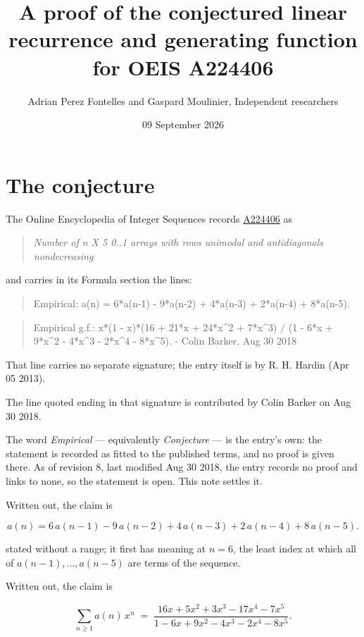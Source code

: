 \documentclass[11pt]{article}
\title{A proof of the conjectured linear recurrence and generating function for OEIS A224406}
\author{Adrian Perez Fontelles and Gaspard Moulinier, Independent researchers}
\date{09 September 2026}
\theoremstyle{definition}
\begin{document}
\maketitle
\section{The conjecture}

The Online Encyclopedia of Integer Sequences records \href{https://oeis.org/A224406}{A224406} as

\begin{quote}\itshape Number of n X 5 0..1 arrays with rows unimodal and antidiagonals nondecreasing\end{quote}

and carries in its Formula section the lines:

\begin{quote}\ttfamily Empirical: a(n) = 6*a(n-1) - 9*a(n-2) + 4*a(n-3) + 2*a(n-4) + 8*a(n-5).\end{quote}

\begin{quote}\ttfamily Empirical g.f.: x*(1 - x)*(16 + 21*x + 24*x\textasciicircum{}2 + 7*x\textasciicircum{}3) / (1 - 6*x + 9*x\textasciicircum{}2 - 4*x\textasciicircum{}3 - 2*x\textasciicircum{}4 - 8*x\textasciicircum{}5). - Colin Barker, Aug 30 2018\end{quote}

That line carries no separate signature; the entry itself is by R. H. Hardin (Apr 05 2013).

The line quoted ending in that signature is contributed by Colin Barker on Aug 30 2018.

The word {\itshape Empirical} --- equivalently {\itshape Conjecture} --- is the entry's own: the statement is recorded as fitted to the published terms, and no proof is given there. As of revision 8, last modified Aug 30 2018, the entry records no proof and links to none, so the statement is open. This note settles it.

Written out, the claim is

\[a(n) = 6\,a(n-1) - 9\,a(n-2) + 4\,a(n-3) + 2\,a(n-4) + 8\,a(n-5).\]

stated without a range; it first has meaning at $n = 6$, the least index at which all of $a(n-1),\dots,a(n-5)$ are terms of the sequence.

Written out, the claim is

\[\sum_{n \ge 1} a(n)\,x^n \;=\; \frac{16x + 5x^{2} + 3x^{3} - 17x^{4} - 7x^{5}}{1 - 6x + 9x^{2} - 4x^{3} - 2x^{4} - 8x^{5}}.\]
\end{document}
